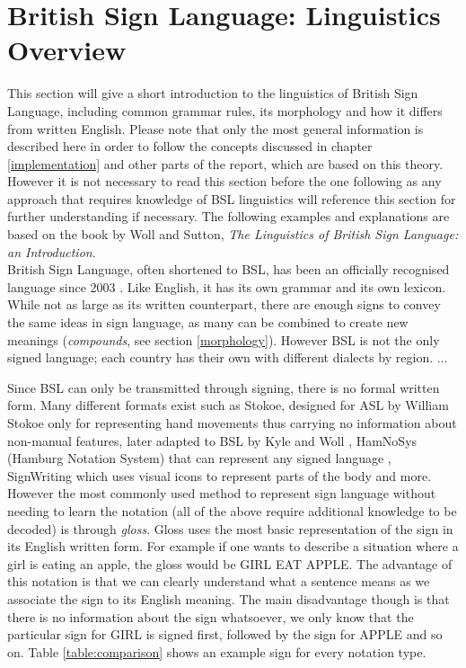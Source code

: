 \documentclass[12pt]{ociamthesis}  %
\begin{document}
\section{British Sign Language: Linguistics Overview}
This section will give a short introduction to the linguistics of British Sign Language, including common grammar rules, its morphology and how it differs from written English. Please note that only the most general information is described here in order to follow the concepts discussed in chapter \ref{implementation} and other parts of the report, which are based on this theory. However it is not necessary to read this section before the one following as any approach that requires knowledge of BSL linguistics will reference this section for further understanding if necessary. The following examples and explanations are based on the book by Woll and Sutton, \textit{The Linguistics of British Sign Language: an Introduction}. \\

British Sign Language, often shortened to BSL, has been an officially recognised language since 2003 . Like English, it has its own grammar  and its own lexicon. While not as large as its written counterpart, there are enough signs to convey the same ideas in sign language, as many can be combined to create new meanings (\textit{compounds}, see section \ref{morphology}). However BSL is not the only signed language; each country has their own with different dialects by region. ...  

Since BSL can only be transmitted through signing, there is no formal written form. Many different formats exist such as Stokoe, designed for ASL by William Stokoe only for representing hand movements  thus carrying no information about non-manual features, later adapted to BSL by Kyle and Woll , HamNoSys (Hamburg Notation System) that can represent any signed language , SignWriting which uses visual icons to represent parts of the body  and more. However the most commonly used method to represent sign language without needing to learn the notation (all of the above require additional knowledge to be decoded) is through \textit{gloss}. Gloss uses the most basic representation of the sign in its English written form. For example if one wants to describe a situation where a girl is eating an apple, the gloss would be GIRL EAT APPLE. The advantage of this notation is that we can clearly understand what a sentence means as we associate the sign to its English meaning. The main disadvantage though is that there is no information about the sign whatsoever, we only know that the particular sign for GIRL is signed first, followed by the sign for APPLE and so on. Table \ref{table:comparison} shows an example sign for every notation type.
\end{document}

